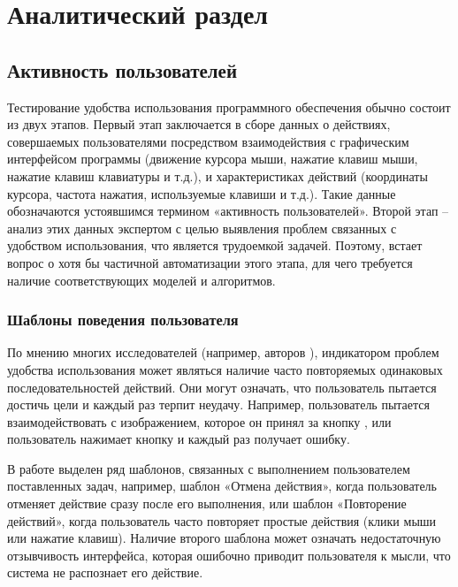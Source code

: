 \chapter{Аналитический раздел}
\label{cha:analysis}


\section{Активность пользователей}

Тестирование удобства использования программного обеспечения обычно состоит из двух этапов. Первый этап заключается в сборе данных о действиях, совершаемых пользователями посредством взаимодействия с графическим интерфейсом программы (движение курсора мыши, нажатие клавиш мыши, нажатие клавиш клавиатуры и т.д.), и характеристиках действий (координаты курсора, частота нажатия, используемые клавиши и т.д.). Такие данные обозначаются устоявшимся термином «активность пользователей». Второй этап – анализ этих данных экспертом с целью выявления проблем связанных с удобством использования, что является трудоемкой задачей. Поэтому, встает вопрос о хотя бы частичной автоматизации этого этапа, для чего требуется наличие соответствующих моделей и алгоритмов.

\subsection{Шаблоны поведения пользователя}
По мнению многих исследователей (например, авторов \cite{1,4,5,6}), индикатором проблем удобства использования может являться наличие часто повторяемых одинаковых последовательностей действий. Они могут означать, что пользователь пытается достичь цели и каждый раз терпит неудачу. Например, пользователь пытается взаимодействовать с изображением, которое он принял за кнопку \cite{1}, или пользователь нажимает кнопку и каждый раз получает ошибку.

В работе \cite{4} выделен ряд шаблонов, связанных с выполнением пользователем поставленных задач, например, шаблон «Отмена действия», когда пользователь отменяет действие сразу после его выполнения, или шаблон «Повторение действий», когда пользователь часто повторяет простые действия (клики мыши или нажатие клавиш). Наличие второго шаблона может означать недостаточную отзывчивость интерфейса, которая ошибочно приводит пользователя к мысли, что система не распознает его действие.

